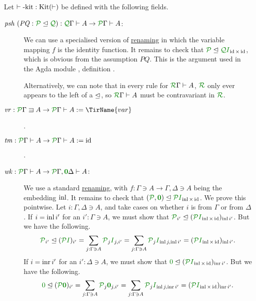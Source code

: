 \documentclass[submission,copyright,creativecommons]{eptcs}
\begin{document}
\begin{definition}\label{tm-kit}
  Let $\vdash\textrm{-kit} : \operatorname{Kit}(\vdash)$ be defined with the following
  fields.
  \begin{description}
    \item[$\mathit{psh}~(\mathit{PQ} : \resctx P \subres \resctx Q)
      : \ctx{\Gamma}{Q} \vdash A \to \ctx{\Gamma}{P} \vdash A$:]
      We can use a specialised version of \hyperref[cor:ren]{renaming} in which
      the variable mapping $f$ is the identity function.
      It remains to check that
      $\resctx P \subres \resctx Q\rescomment I_{\id\times\id}$, which is
      obvious from the assumption $\mathit{PQ}$.
      This is the argument used in the Agda module
      , definition .

      Alternatively, we can note that in every rule for
      $\ctx{\Gamma}{R} \vdash A$, $\resctx R$ only ever appears to the left of a
      $\trianglelefteq$, so $\ctx{\Gamma}{R} \vdash A$ must be contravariant in
      $\resctx R$.
    \item[$\mathit{vr} : \ctx{\Gamma}{P} \lvar A \to \ctx{\Gamma}{P} \vdash A
      := \TirName{var}$].
    \item[$\mathit{tm} : \ctx{\Gamma}{P} \vdash A \to \ctx{\Gamma}{P} \vdash A
      := \mathrm{id}$].
    \item[$\mathit{wk} : \ctx{\Gamma}{P} \vdash A
      \to \ctx{\Gamma}{P}, \ctx{\Delta}{\vct 0} \vdash A$:]
      We use a standard \hyperref[cor:ren]{renaming}, with
      $f : \Gamma \ni A \to \Gamma, \Delta \ni A$ being the embedding $\operatorname{inl}$.
      It remains to check that
      $(\resctx P, \rescomment{\vct 0}) \subres
      \resctx P\rescomment I_{\inl\times\id}$.
      We prove this pointwise.
      Let $i : \Gamma, \Delta \ni A$, and take cases on whether $i$ is from
      $\Gamma$ or from $\Delta$.
      If $i = \operatorname{inl} i'$ for an $i' : \Gamma \ni A$, we must show that
      $\resctx P_{i'} \subres
      (\resctx P\rescomment I_{\inl\times\id})_{\inl i'}$.
      But we have the following.
      \[
      \resctx P_{i'} \subres (\resctx P\rescomment I)_{i'}
      = \sum_{j : \Gamma \ni A} \resctx P_j\rescomment I_{j,i'}
      = \sum_{j : \Gamma \ni A} \resctx P_j\rescomment I_{\inl j,\inl i'}
      = (\resctx P\rescomment I_{\inl\times\id})_{\inl i'}.
      \]
      If $i = \operatorname{inr} i'$ for an $i' : \Delta \ni A$, we must show that
      $\rescomment 0 \subres
      (\resctx P\rescomment I_{\inl\times\id})_{\inr i'}$.
      But we have the following.
      \[
      \rescomment 0 \subres (\resctx P\rescomment{\vct 0})_{i'}
      = \sum_{j : \Gamma \ni A} \resctx P_j\rescomment{\vct 0}_{j,i'}
      = \sum_{j : \Gamma \ni A} \resctx P_j\rescomment I_{\inl j,\inr i'}
      = (\resctx P\rescomment I_{\inl\times\id})_{\inr i'}.
      \]
  \end{description}
\end{definition}
\end{document}
